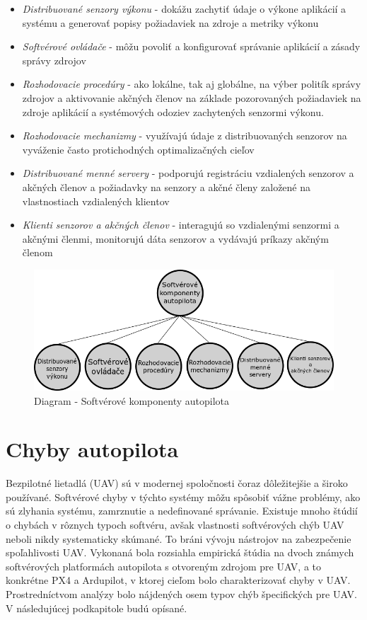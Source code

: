 \documentclass[10pt,twoside,slovak,a4paper]{article}
\begin{document}
\begin{itemize}
\item \emph{Distribuované senzory výkonu} - dokážu zachytiť údaje o výkone aplikácií a systému a generovať popisy požiadaviek na zdroje a metriky výkonu
\item \emph{Softvérové ovládače} - môžu povoliť a konfigurovať správanie aplikácií a zásady správy zdrojov
\item \emph{Rozhodovacie procedúry} - ako lokálne, tak aj globálne, na výber politík správy zdrojov a aktivovanie akčných členov na základe pozorovaných požiadaviek na zdroje aplikácií a systémových odoziev zachytených senzormi výkonu.
\item \emph{Rozhodovacie mechanizmy} - využívajú údaje z distribuovaných senzorov na vyváženie často protichodných optimalizačných cieľov
\item \emph{Distribuované menné servery} - podporujú registráciu vzdialených senzorov a akčných členov a požiadavky na senzory a akčné členy založené na vlastnostiach vzdialených klientov
\item \emph{Klienti senzorov a akčných členov} - interagujú so vzdialenými senzormi a akčnými členmi, monitorujú dáta senzorov a vydávajú príkazy akčným členom \cite{SoftverAutopilot}
\end{itemize}

\begin{figure}[tbh]
\centering
\includegraphics[scale=0.40]{diagram.png}
\caption{Diagram - Softvérové komponenty autopilota\cite{SoftverAutopilot}}
\label{f:diagram}
\end{figure}

\section{Chyby autopilota} \label{chyby}

Bezpilotné lietadlá (UAV) sú v modernej spoločnosti čoraz dôležitejšie a široko používané. Softvérové chyby v týchto systémy môžu spôsobiť vážne problémy, ako sú zlyhania systému, zamrznutie a nedefinované správanie. Existuje mnoho štúdií o chybách v rôznych typoch softvéru, avšak vlastnosti softvérových chýb UAV neboli nikdy systematicky skúmané. To bráni vývoju nástrojov na zabezpečenie spoľahlivosti UAV. Vykonaná bola rozsiahla empirická štúdia na dvoch známych softvérových platformách autopilota s otvoreným zdrojom pre UAV, a to konkrétne PX4 a Ardupilot, v ktorej cieľom bolo charakterizovať chyby v UAV. Prostredníctvom analýzy bolo nájdených osem typov chýb špecifických pre UAV. V následujúcej podkapitole budú opísané.\cite{chybyautopilot}
\end{document}
